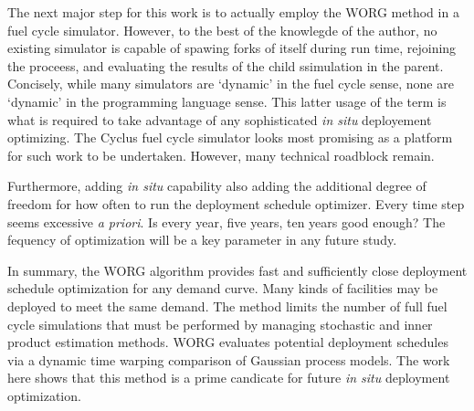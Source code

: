The next major step for this work is to actually employ the WORG method in 
a fuel cycle simulator.  However, to the best of the knowlegde of the 
author, no existing simulator is capable of spawing forks of itself 
during run time, rejoining the proceess, and evaluating the results of the 
child ssimulation in the parent. Concisely, while many simulators are 
`dynamic' in the fuel cycle sense, none are `dynamic' in the programming
language sense. This latter usage of the term is what is required to 
take advantage of any sophisticated \emph{in situ} deployement optimizing.
The Cyclus fuel cycle simulator looks most promising as a platform
for such work to be undertaken. However, many technical roadblock remain.

Furthermore, adding \emph{in situ} capability also adding the additional 
degree of freedom for how often to run the deployment schedule optimizer.
Every time step seems excessive \emph{a priori}. Is every year, five years,
ten years good enough? The fequency of optimization will be a key 
parameter in any future study.

In summary, the WORG algorithm provides fast and sufficiently close 
deployment schedule optimization for any demand curve.  Many kinds of 
facilities may be deployed to meet the same demand.  The method 
limits the number of full fuel cycle simulations that must be performed by
managing stochastic and inner product estimation methods. WORG
evaluates potential deployment schedules via a dynamic time warping 
comparison of Gaussian process models. The work here shows that this 
method is a prime candicate for future \emph{in situ} deployment 
optimization. 


